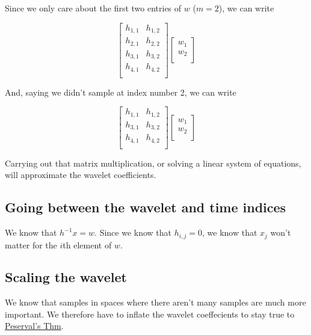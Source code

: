 \documentclass[leqno]{article}
\newcommand{\perseval}{http://en.wikipedia.org/wiki/Parseval's_theorem}
\begin{document}
            Since we only care about the first two entries of $w$ ($m=2$), we can write

            $$
                \begin{bmatrix}  
                    h_{1,1} & h_{1,2}  \\
                    h_{2,1} & h_{2,2}  \\
                    h_{3,1} & h_{3,2}  \\
                    h_{4,1} & h_{4,2}  \\
                
                \end{bmatrix}
                \begin{bmatrix}
                    w_1 \\ w_2 \\ 
                \end{bmatrix}
            $$

            And, saying we didn't sample at index number 2, we can write

            $$
                \begin{bmatrix}  
                    h_{1,1} & h_{1,2}  \\
                    h_{3,1} & h_{3,2}  \\
                    h_{4,1} & h_{4,2}  \\
                
                \end{bmatrix}
                \begin{bmatrix}
                    w_1 \\ w_2 \\ 
                \end{bmatrix}
            $$

            Carrying out that matrix multiplication, or solving a linear system of equations, will approximate the wavelet coefficients.

        \subsection{Going between the wavelet and time indices}

            We know that $h^{-1} x = w $. Since we know that  $h_{i, j} = 0$, we know that $x_j$ won't matter for the $i$th element of $w$.
            
        \subsection{Scaling the wavelet}
            We know that samples in spaces where there aren't many samples are much more important. We therefore have to inflate the wavelet coeffecients to stay true to \href{\perseval}{Peserval's Thm}.
\end{document}
